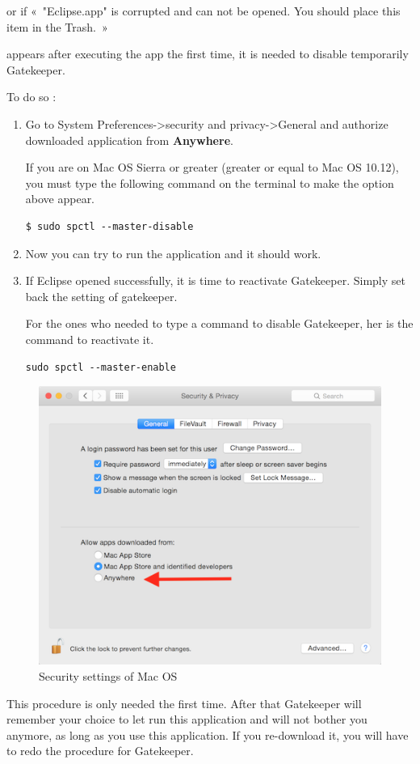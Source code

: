 \documentclass[a4paper]{article}
\begin{document}
or if « "Eclipse.app" is corrupted and can not be opened. You should place this item in the Trash. »

appears after executing the app the first time, it is needed to disable temporarily Gatekeeper.

To do so :
\begin{enumerate}
\item Go to System Preferences->security and privacy->General and authorize downloaded application from \textbf{Anywhere}.

If you are on Mac OS Sierra or greater (greater or equal to Mac OS 10.12), you must type the following command on the terminal to make the option above appear.
\begin{lstlisting}
$ sudo spctl --master-disable
\end{lstlisting}
\item Now you can try to run the application and it should work.
\item If Eclipse opened successfully, it is time to reactivate Gatekeeper. Simply set back the setting of gatekeeper.

For the ones who needed to type a command to disable Gatekeeper, her is the command to reactivate it.
\begin{lstlisting}
sudo spctl --master-enable
\end{lstlisting}
\end{enumerate}

\begin{figure}[!h]
\centering
\includegraphics[width=0.7\columnwidth]{fig/security_tab_mac}
\caption{Security settings of Mac OS}
\label{fig:security_tab_mac}
\end{figure}

This procedure is only needed the first time. After that Gatekeeper will remember your choice to let run this application and will not bother you anymore, as long as you use this application. If you re-download it, you will have to redo the procedure for Gatekeeper.
\end{document}
